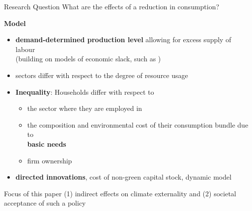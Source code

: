 \documentclass[11pt,aspectratio=169]{beamer}
\begin{document}
\begin{frame}{}
	\vspace{4mm}
		\begin{block}{Research Question}
			What are the effects of a reduction in consumption?%
	\end{block}
%
\pause
\textbf{Model}
\pause
\vspace{-2mm}
	\begin{itemize}[<+-| alert@+>]
		\item \textbf{demand-determined production level} allowing for excess supply of labour \\
		\small{(building on models of economic slack, such as \cite{Auerbach2021InequalityEconomy})}
		
		\item sectors differ with respect to the degree of resource usage %
		\item \textbf{Inequality}: Households differ with respect to
		\begin{itemize}
	
\item the sector where they are employed in
\item the composition and environmental cost of their consumption bundle due to\\ \textbf{basic needs} 
\item firm ownership
		\end{itemize}
	\item \textbf{directed innovations}, cost of non-green capital stock, dynamic model
	\end{itemize}
\vspace{2mm}
\pause 
\begin{block}{Focus of this paper}
(1) indirect effects on climate externality  and (2) societal acceptance of such a policy
\end{block}
\end{frame}
\end{document}
